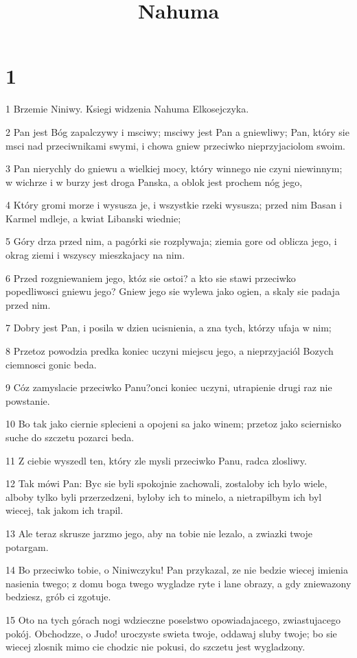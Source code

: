

\title{Nahuma}


\chapter{1}

\par 1 Brzemie Niniwy. Ksiegi widzenia Nahuma Elkosejczyka.
\par 2 Pan jest Bóg zapalczywy i msciwy; msciwy jest Pan a gniewliwy; Pan, który sie msci nad przeciwnikami swymi, i chowa gniew przeciwko nieprzyjaciolom swoim.
\par 3 Pan nierychly do gniewu a wielkiej mocy, który winnego nie czyni niewinnym; w wichrze i w burzy jest droga Panska, a oblok jest prochem nóg jego,
\par 4 Który gromi morze i wysusza je, i wszystkie rzeki wysusza; przed nim Basan i Karmel mdleje, a kwiat Libanski wiednie;
\par 5 Góry drza przed nim, a pagórki sie rozplywaja; ziemia gore od oblicza jego, i okrag ziemi i wszyscy mieszkajacy na nim.
\par 6 Przed rozgniewaniem jego, któz sie ostoi? a kto sie stawi przeciwko popedliwosci gniewu jego? Gniew jego sie wylewa jako ogien, a skaly sie padaja przed nim.
\par 7 Dobry jest Pan, i posila w dzien ucisnienia, a zna tych, którzy ufaja w nim;
\par 8 Przetoz powodzia predka koniec uczyni miejscu jego, a nieprzyjaciól Bozych ciemnosci gonic beda.
\par 9 Cóz zamyslacie przeciwko Panu?onci koniec uczyni, utrapienie drugi raz nie powstanie.
\par 10 Bo tak jako ciernie splecieni a opojeni sa jako winem; przetoz jako sciernisko suche do szczetu pozarci beda.
\par 11 Z ciebie wyszedl ten, który zle mysli przeciwko Panu, radca zlosliwy.
\par 12 Tak mówi Pan: Byc sie byli spokojnie zachowali, zostaloby ich bylo wiele, alboby tylko byli przerzedzeni, byloby ich to minelo, a nietrapilbym ich byl wiecej, tak jakom ich trapil.
\par 13 Ale teraz skrusze jarzmo jego, aby na tobie nie lezalo, a zwiazki twoje potargam.
\par 14 Bo przeciwko tobie, o Niniwczyku! Pan przykazal, ze nie bedzie wiecej imienia nasienia twego; z domu boga twego wygladze ryte i lane obrazy, a gdy zniewazony bedziesz, grób ci zgotuje.
\par 15 Oto na tych górach nogi wdzieczne poselstwo opowiadajacego, zwiastujacego pokój. Obchodzze, o Judo! uroczyste swieta twoje, oddawaj sluby twoje; bo sie wiecej zlosnik mimo cie chodzic nie pokusi, do szczetu jest wygladzony.

